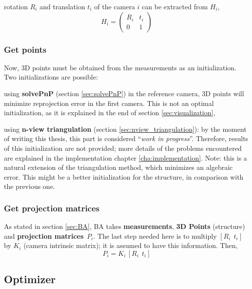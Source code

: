 rotation $R_i$ and translation $t_i$ of the camera $i$ can be extracted from $H_i$,
\begin{equation}
 H_i = \begin{pmatrix}
        R_i & t_i \\
        0   & 1
        \end{pmatrix}
\end{equation}

\subsubsection*{Get points}

Now, 3D points must be obtained from the measurements as an initialization. Two initializations are possible:
\begin{itemize*}
 \item using \textbf{solvePnP} (section \ref{sec:solvePnP}) in the reference camera, 3D points will minimize reprojection error in the first camera. This is not an optimal initialization, as it is explained in the end of section \ref{sec:visualization},

 \item using \textbf{n-view triangulation} (section \ref{sec:nview_triangulation}): by the moment of writing this thesis, this part is considered ``\textit{work in progress}''. Therefore, results of this initialization are not provided; more details of the problems encountered are explained in the implementation chapter \ref{cha:implementation}. Note: this is a natural extension of the triangulation method, which minimizes an algebraic error. This might be a better initialization for the structure, in comparison with the previous one.
\end{itemize*}



\subsubsection*{Get projection matrices}

As stated in section \ref{sec:BA}, BA takes \textbf{measurements}, \textbf{3D Points} (structure) and \textbf{projection matrices}~$P_i$. The last step needed here is to multiply $[R_i ~~ t_i]$ by $K_i$ (camera intrinsic matrix); it is assumed to have this information. Then,
\[
 P_i = K_i \, [R_i ~~ t_i]
\]


\subsection{Optimizer}

